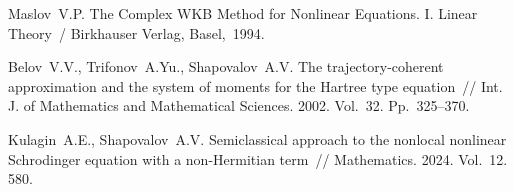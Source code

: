 %



\begin{thebibliography}{9} %

 Maslov~V.P. The Complex WKB Method for Nonlinear Equations. I. Linear Theory~/ Birkhauser Verlag, Basel,~1994.

 Belov~V.V., Trifonov~A.Yu., Shapovalov~A.V. The trajectory-coherent approximation and the system of moments for the Hartree type equation~// Int. J. of Mathematics and Mathematical Sciences. 2002. Vol.~32. Pp.~325--370.

 Kulagin~A.E., Shapovalov~A.V. Semiclassical approach to the nonlocal nonlinear Schrodinger equation with a non-Hermitian term~// Mathematics. 2024. Vol.~12. 580.


\end{thebibliography}







%


